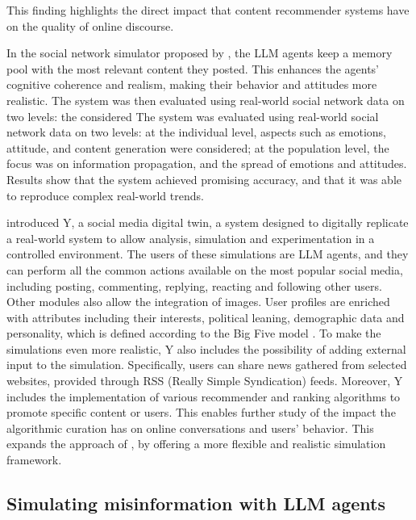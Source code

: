 This finding highlights the direct impact that content recommender systems have on the quality of online discourse.
\medskip

In the social network simulator proposed by \citet{gao2023s3socialnetworksimulationlarge}, the LLM agents keep a memory pool with the most relevant content they posted. This enhances the agents' cognitive coherence and realism, making their behavior and attitudes more realistic.
The system was then evaluated using real-world social network data on two levels: the considered The system was evaluated using real-world social network data on two levels: at the individual level, aspects such as emotions, attitude, and content generation were considered; at the population level, the focus was on information propagation, and the spread of emotions and attitudes. 
Results show that the system achieved promising accuracy, and that it was able to reproduce complex real-world trends.

\medskip
\citet{rossetti2024ysocialllmpoweredsocial} introduced Y, a social media digital twin, a system designed to digitally replicate a real-world system to allow analysis, simulation and experimentation in a controlled environment.
The users of these simulations are LLM agents, and they can perform all the common actions available on the most popular social media, including posting, commenting, replying, reacting and following other users. Other modules also allow the integration of images.
User profiles are enriched with attributes including their interests, political leaning, demographic data and personality, which is defined according to the Big Five model \cite{McCrae1992}.
To make the simulations even more realistic, Y also includes the possibility of adding external input to the simulation. Specifically, users can share news gathered from selected websites, provided through RSS (Really Simple Syndication) feeds.
Moreover, Y includes the implementation of various recommender and ranking algorithms to promote specific content or users. This enables further study of the impact the algorithmic curation has on online conversations and users' behavior. This expands the approach of \citet{törnberg2023evaluate}, by offering a more flexible and realistic simulation framework.



\subsection{Simulating misinformation with LLM agents}

